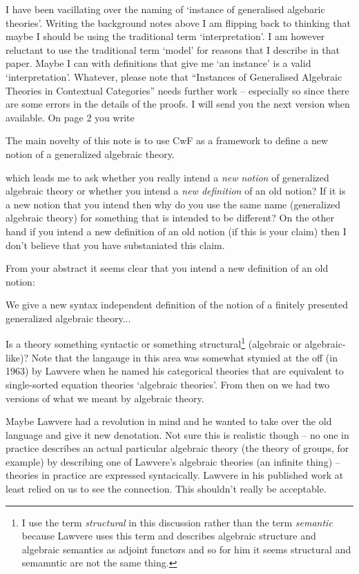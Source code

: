 \note
I have been vacillating over the naming of `instance of generalised algebaric theories'. Writing the background notes above I am flipping back to
thinking that maybe I should be using the traditional term `interpretation'. I am however reluctant to use the traditional term `model' for reasons that I describe in that paper. Maybe I can with definitions that give me  `an instance' is a valid `interpretation'. 
Whatever, please note that ``Instances of Generalised Algebraic Theories in Contextual Categories'' needs further work -- especially so
since there are some errors in the details of the proofs. I will send you the next version when available.
\note
On page 2 you write 
\begin{tightquote}
The main novelty of this note is to use CwF
as a framework to define a new notion of a generalized algebraic theory.
\end{tightquote}
which leads me to ask whether you really intend a \textit{new notion} of generalized algebraic theory 
or whether you intend a \textit{new definition} of an old notion? 
If it is a new notion that you intend then why do you use the same name (generalized algebraic theory) for something that is intended to be different?
On the other hand if you intend a new definition of an old notion (if this is your claim) then I don't believe that you have substaniated this claim.

\note
From your abstract it seems clear that you intend a new definition of an old notion:
\begin{tightquote}
We give a new syntax independent definition of 
the notion of a finitely presented generalized algebraic theory...
\end{tightquote}


\note 
Is a theory something syntactic or something structural\footnote{I use the term \textit{structural} in this discussion rather than 
the term \textit{semantic} because Lawvere uses this term and describes
algebraic structure and algebraic semantics as adjoint functors and so for him it seems structural and semamntic are not the same thing. }
(algebraic or algebraic-like)?
Note that the langauge in this area was somewhat stymied at the off (in 1963) by Lawvere when he
named his categorical theories that are equivalent to single-sorted equation theories `algebraic theories'. 
From then on we had two versions of what we meant by algebraic theory.
  
Maybe Lawvere had a revolution in mind and he wanted to take over the  old language and give it new denotation. 
Not sure this is realistic though -- no one in practice describes an actual particular algebraic theory (the theory of groups, for example) by describing one of Lawvere's algebraic theories (an infinite thing)  -- theories in practice are expressed syntacically.  Lawvere in his published work at least relied on us to see the connection. This shouldn't really be acceptable. 

